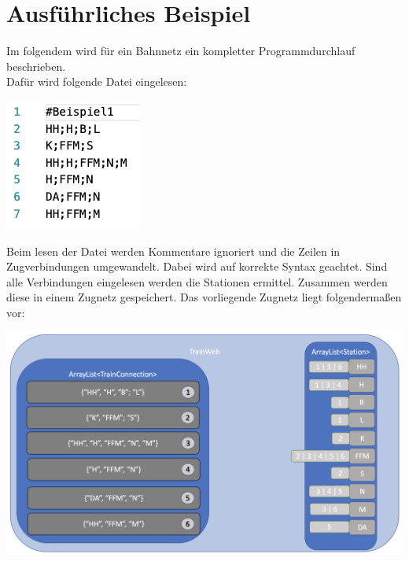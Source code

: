 \section{Ausführliches Beispiel}\label{test:sec:ausfuehrliches-beispiel}
Im folgendem wird für ein Bahnnetz ein kompletter Programmdurchlauf beschrieben.\\

Dafür wird folgende Datei eingelesen:\\
\begin{center}
    \includegraphics[scale=0.75]{images/Programmdurchlauf/eingabedatei.png}
    \label{test:subsecpar:eingabedatei}
\end{center}

Beim lesen der Datei werden Kommentare ignoriert und die Zeilen in Zugverbindungen umgewandelt. Dabei wird auf korrekte Syntax geachtet.
Sind alle Verbindungen eingelesen werden die Stationen ermittel. Zusammen werden diese in einem Zugnetz gespeichert. Das vorliegende Zugnetz liegt folgendermaßen vor:\\

\begin{center}
    \includegraphics[width=\linewidth]{images/Programmdurchlauf/Datenstruktur01.png}
    \label{test:subsecpar:datenstruktur1}
\end{center}

